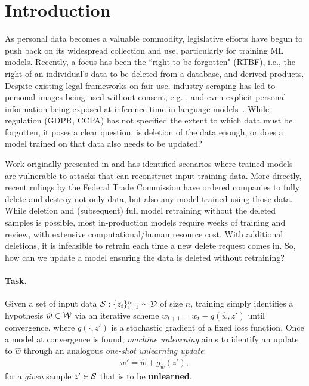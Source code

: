\section{Introduction}
As personal data becomes a valuable commodity, legislative efforts have begun to push back on its widespread collection and use, particularly for training ML models. Recently, a focus has been the ``right to be forgotten" (RTBF), i.e., the right of an individual's data to be deleted from a database, and derived products.
Despite existing legal frameworks on fair use, industry scraping has led to personal images being used without consent, e.g. \cite{Exposing}, and even explicit personal information being exposed at inference time in language models~\citep{carlini2021extracting}.
While regulation (GDPR, CCPA) has not specified the extent to which data must be forgotten, it poses a clear question: is  deletion of the data enough, or does a model trained on that data also needs to be updated?

Work originally presented in \cite{carlini2019secret} and \cite{carlini2020attack} has identified scenarios where trained models are vulnerable to attacks that can reconstruct input training data. More directly, recent rulings by the Federal Trade Commission \cite{ftc,ftc2} have ordered companies to fully delete and destroy not only data, but also any model trained using those data.
While deletion and (subsequent) full model retraining without the deleted samples is possible, most in-production models require weeks of 
training and review, with extensive computational/human resource cost. With additional deletions, it is infeasible to retrain each time a new delete request comes in. 
So, how can we update a model ensuring the data is deleted without retraining?

\paragraph{Task.} Given a set of input data $\mathcal{S}: \{z_i\}_{i=1}^n \sim \mathcal{D}$ of size $n$, training simply identifies a hypothesis $\hat{w} \in \mathcal{W}$  via an iterative scheme $w_{t+1} = w_t - g(\hat{w},z')$ until convergence, where $g(\cdot,z')$ is  a stochastic gradient of a fixed loss function. Once a model at convergence is found, \textit{machine unlearning} aims to identify an update to $\hat{w}$ through an analogous {\em one-shot unlearning update}:
\begin{align}\label{eq:unlearn}
    w' = \hat{w} + g_{\hat{w}}\left(z'\right),
\end{align}
for a \textit{given} sample $z' \in \mathcal{S}$ that is to be \textbf{unlearned}.


